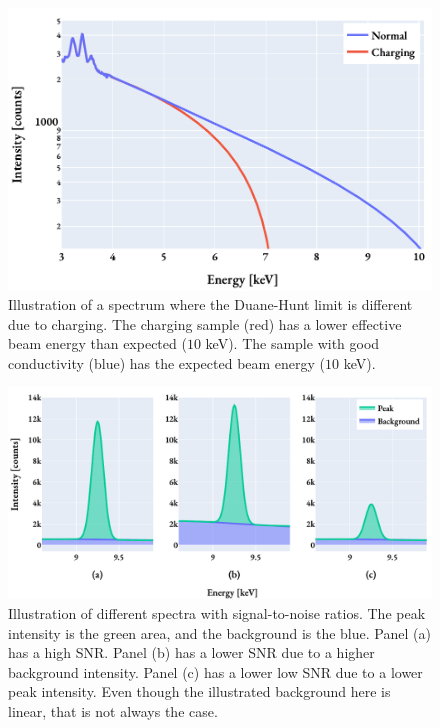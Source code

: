
\begin{figure}[htp]
    \centering
    \includegraphics[width=0.8\linewidth]{figures/pp_duane-hunt.pdf}
    \caption{
        Illustration of a spectrum where the Duane-Hunt limit is different due to charging.
        The charging sample (red) has a lower effective beam energy than expected ($10$ keV).
        The sample with good conductivity (blue) has the expected beam energy ($10$ keV).
    }
    \label{fig:theory:eds_performance:overview:duanehunt}
\end{figure}


\begin{figure}[htp]
    \centering
    \includegraphics[width=0.95\linewidth]{figures/pp_fiori_snr.pdf}
    \caption{
        Illustration of different spectra with signal-to-noise ratios.
        The peak intensity is the green area, and the background is the blue.
        Panel (a) has a high SNR.
        Panel (b) has a lower SNR due to a higher background intensity.
        Panel (c) has a lower low SNR due to a lower peak intensity.
        Even though the illustrated background here is linear, that is not always the case.
    }
    \label{fig:theory:eds_performance:overview:fiori_snr}
\end{figure}


